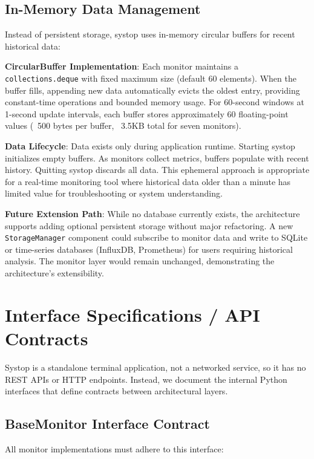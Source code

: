 \documentclass[12pt,a4paper,oneside]{report}
\begin{document}
\subsection{In-Memory Data Management}

Instead of persistent storage, systop uses in-memory circular buffers for recent historical data:

\textbf{CircularBuffer Implementation}: Each monitor maintains a \texttt{collections.deque} with fixed maximum size (default 60 elements). When the buffer fills, appending new data automatically evicts the oldest entry, providing constant-time operations and bounded memory usage. For 60-second windows at 1-second update intervals, each buffer stores approximately 60 floating-point values (~500 bytes per buffer, ~3.5KB total for seven monitors).

\textbf{Data Lifecycle}: Data exists only during application runtime. Starting systop initializes empty buffers. As monitors collect metrics, buffers populate with recent history. Quitting systop discards all data. This ephemeral approach is appropriate for a real-time monitoring tool where historical data older than a minute has limited value for troubleshooting or system understanding.

\textbf{Future Extension Path}: While no database currently exists, the architecture supports adding optional persistent storage without major refactoring. A new \texttt{StorageManager} component could subscribe to monitor data and write to SQLite or time-series databases (InfluxDB, Prometheus) for users requiring historical analysis. The monitor layer would remain unchanged, demonstrating the architecture's extensibility.

\section{Interface Specifications / API Contracts}
\label{sec:interface-specifications}

Systop is a standalone terminal application, not a networked service, so it has no REST APIs or HTTP endpoints. Instead, we document the internal Python interfaces that define contracts between architectural layers.

\subsection{BaseMonitor Interface Contract}

All monitor implementations must adhere to this interface:
\end{document}
